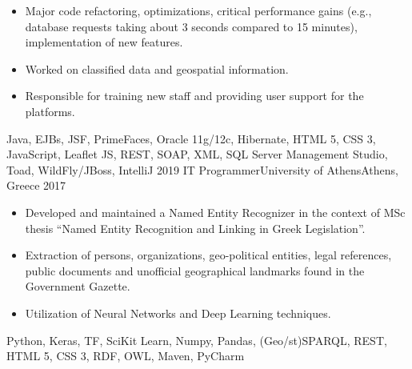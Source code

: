 \begin{experiences}
{\begin{itemize}
                      \item Major code refactoring, optimizations, critical performance gains (e.g., database requests taking about 3 seconds compared to 15 minutes), 
                      implementation of new features.

                      \item Worked on classified data and geospatial information.

                      \item Responsible for training new staff and providing user support for the platforms.
                    \end{itemize}
                    }
                    {Java, EJBs, JSF, PrimeFaces, Oracle 11g/12c, Hibernate, HTML 5, CSS 3, JavaScript, Leaflet JS, REST, SOAP, XML, SQL Server Management Studio, Toad, WildFly/JBoss, IntelliJ}
  \emptySeparator
  \experience
    {2019} {IT Programmer}{University of Athens}{Athens, Greece}
    {2017}    {
                    \begin{itemize}
                      \item Developed and maintained a Named Entity Recognizer in the context of MSc thesis ``Named Entity Recognition and Linking in Greek Legislation''.

                      \item Extraction of persons, organizations, geo-political entities, legal references, public documents and unofficial geographical landmarks found in the Government Gazette.

                      \item Utilization of Neural Networks and Deep Learning techniques.
                    \end{itemize}
                    }
                    {Python, Keras, TF, SciKit Learn, Numpy, Pandas, (Geo/st)SPARQL, REST, HTML 5, CSS 3, RDF, OWL, Maven, PyCharm}
\end{experiences}
